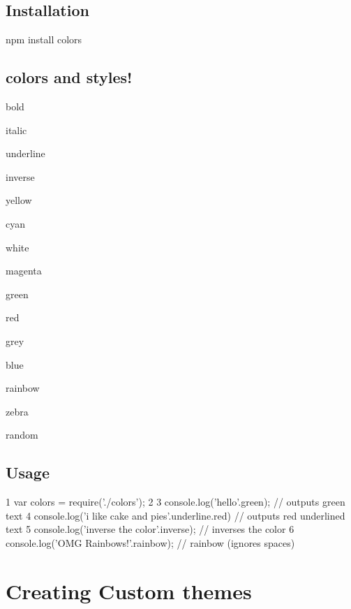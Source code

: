 

\subsection*{Installation}

\begin{DoxyVerb}npm install colors
\end{DoxyVerb}


\subsection*{colors and styles!}


\begin{DoxyItemize}
\item bold
\item italic
\item underline
\item inverse
\item yellow
\item cyan
\item white
\item magenta
\item green
\item red
\item grey
\item blue
\item rainbow
\item zebra
\item random
\end{DoxyItemize}

\subsection*{Usage}


\begin{DoxyCode}
1 var colors = require('./colors');
2 
3 console.log('hello'.green); // outputs green text
4 console.log('i like cake and pies'.underline.red) // outputs red underlined text
5 console.log('inverse the color'.inverse); // inverses the color
6 console.log('OMG Rainbows!'.rainbow); // rainbow (ignores spaces)
\end{DoxyCode}


\section*{Creating Custom themes}


